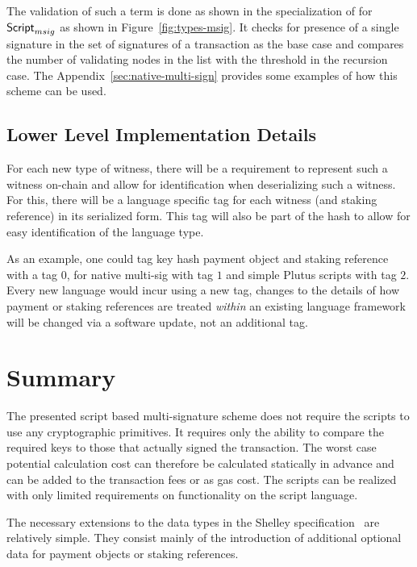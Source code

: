 \documentclass[11pt,a4paper,dvipsnames]{article}
\newcommand{\Script}{\type{Script}}
\newcommand{\ScriptMSig}{\Script_{msig}}
\theoremstyle{definition}
\begin{document}
The validation of such a term is done as shown in the specialization of
 for $\ScriptMSig$ as shown in Figure~\ref{fig:types-msig}.
It checks for presence of a single signature in the set of signatures of a
transaction as the base case and compares the number of validating nodes in the
list with the threshold in the recursion case. The
Appendix~\ref{sec:native-multi-sign} provides some examples of how this scheme
can be used.

\subsection{Lower Level Implementation Details}
\label{sec:lower-level-impl}

For each new type of witness, there will be a requirement to represent such a
witness on-chain and allow for identification when deserializing such a
witness. For this, there will be a language specific tag for each witness (and
staking reference) in its serialized form. This tag will also be part of the
hash to allow for easy identification of the language type.

As an example, one could tag key hash payment object and staking reference with
a tag $0$, for native multi-sig with tag $1$ and simple Plutus scripts with tag
$2$. Every new language would incur using a new tag, changes to the details of
how payment or staking references are treated \emph{within} an existing language
framework will be changed via a software update, not an additional tag.

\section{Summary}
\label{sec:summary}

The presented script based multi-signature scheme does not require the scripts
to use any cryptographic primitives. It requires only the ability to compare the
required keys to those that actually signed the transaction. The worst case
potential calculation cost can therefore be calculated statically in advance and
can be added to the transaction fees or as gas cost. The scripts can be realized
with only limited requirements on functionality on the script language.

The necessary extensions to the data types in the Shelley
specification~\cite{shelley_formal_spec} are relatively simple. They consist
mainly of the introduction of additional optional data for payment objects or
staking references.
\end{document}
